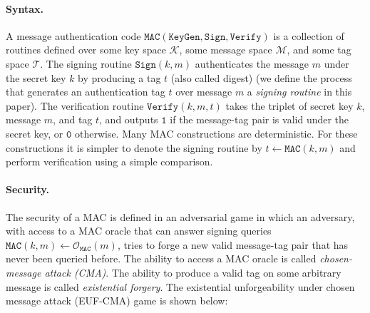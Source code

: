 \documentclass[runningheads]{llncs}
\newcommand{\keygen}{\texttt{KeyGen}}
\newcommand{\mac}{\texttt{MAC}}
\newcommand{\sign}{\texttt{Sign}}
\newcommand{\verify}{\texttt{Verify}}
\begin{document}
\paragraph{Syntax.} A message authentication code $\mac(\keygen, \sign, \verify)$ is a collection of routines defined over some key space $\mathcal{K}$, some message space $\mathcal{M}$, and some tag space $\mathcal{T}$. The signing routine $\sign(k, m)$ authenticates the message $m$ under the secret key $k$ by producing a tag $t$ (also called digest) (we define the process that generates an authentication tag $t$ over message $m$ a \textit{signing routine} in this paper). The verification routine $\verify(k, m, t)$ takes the triplet of secret key $k$, message $m$, and tag $t$, and outputs $\texttt{1}$ if the message-tag pair is valid under the secret key, or $\texttt{0}$ otherwise. Many MAC constructions are deterministic. For these constructions it is simpler to denote the signing routine by $t \leftarrow \mac(k, m)$ and perform verification using a simple comparison.

\paragraph{Security.} The security of a MAC is defined in an adversarial game in which an adversary, with access to a MAC oracle that can answer signing queries $\mac(k, m) \leftarrow \mathcal{O}_\mac(m)$, tries to forge a new valid message-tag pair that has never been queried before. The ability to access a MAC oracle is called \emph{chosen-message attack (CMA)}. The ability to produce a valid tag on some arbitrary message is called \emph{existential forgery}. The existential unforgeability under chosen message attack (EUF-CMA) game is shown below:
\end{document}
